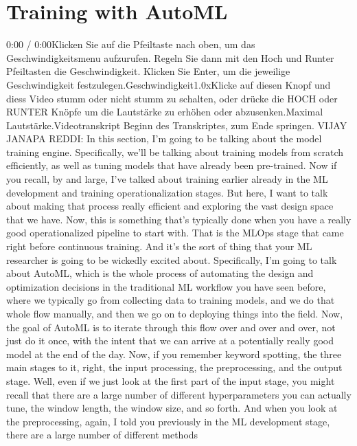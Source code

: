{{{{\section{Training with AutoML}

    0:00 / 0:00Klicken Sie auf die Pfeiltaste nach oben, um das Geschwindigkeitsmenu aufzurufen. Regeln Sie dann mit den Hoch und Runter Pfeiltasten die Geschwindigkeit. Klicken Sie Enter, um die jeweilige Geschwindigkeit festzulegen.Geschwindigkeit1.0xKlicke auf diesen Knopf und diess Video stumm oder nicht stumm zu schalten, oder drücke die HOCH oder RUNTER Knöpfe um die Lautstärke zu erhöhen oder abzusenken.Maximal Lautstärke.Videotranskript
    Beginn des Transkriptes, zum Ende springen.
    VIJAY JANAPA REDDI: In this section, I'm going
    to be talking about the model training engine.
    Specifically, we'll be talking about training models from scratch
    efficiently, as well as tuning models that have already been pre-trained.
    Now if you recall, by and large, I've talked
    about training earlier already in the ML development
    and training operationalization stages.
    But here, I want to talk about making that process really efficient
    and exploring the vast design space that we have.
    Now, this is something that's typically done
    when you have a really good operationalized pipeline to start with.
    That is the MLOps stage that came right before continuous training.
    And it's the sort of thing that your ML researcher
    is going to be wickedly excited about.
    Specifically, I'm going to talk about AutoML,
    which is the whole process of automating the design and optimization
    decisions in the traditional ML workflow you have seen before,
    where we typically go from collecting data to training models,
    and we do that whole flow manually, and then we go on
    to deploying things into the field.
    Now, the goal of AutoML is to iterate through this flow over
    and over and over, not just do it once, with the intent that we
    can arrive at a potentially really good model at the end of the day.
    Now, if you remember keyword spotting, the three main stages
    to it, right, the input processing, the preprocessing, and the output stage.
    Well, even if we just look at the first part of the input stage,
    you might recall that there are a large number of different hyperparameters
    you can actually tune, the window length, the window size, and so forth.
    And when you look at the preprocessing, again,
    I told you previously in the ML development stage,
    there are a large number of different methods
}}}}
